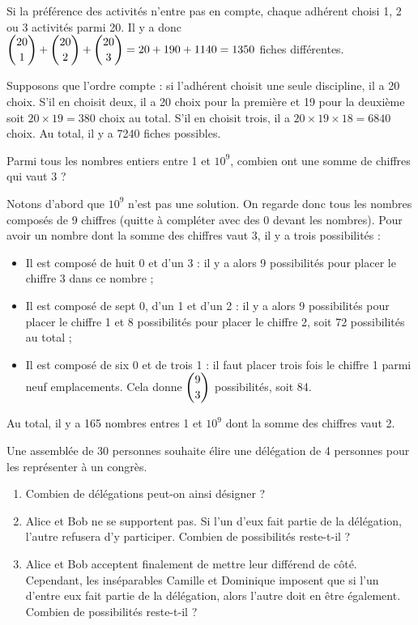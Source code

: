 \documentclass[11pt,fleqn, openany]{book} %
\begin{document}
\begin{solution}Si la préférence des activités n'entre pas en compte, chaque adhérent choisi 1, 2 ou 3 activités parmi 20. Il y a donc $\dbinom{20}{1}+\dbinom{20}{2}+\dbinom{20}{3}=20+190+1140=1350$ fiches différentes.

Supposons que l'ordre compte : si l'adhérent choisit une seule discipline, il a 20 choix. S'il en choisit deux, il a 20 choix pour la première et 19 pour la deuxième soit $20 \times 19 = 380$ choix au total. S'il en choisit trois, il a $20 \times 19 \times 18=6840$ choix. Au total, il y a 7240 fiches possibles.\end{solution}



\begin{exercise}Parmi tous les nombres entiers entre 1 et $10^9$, combien ont une somme de chiffres qui vaut 3 ?\end{exercise}

\begin{solution}Notons d'abord que $10^9$ n'est pas une solution. On regarde donc tous les nombres composés de 9 chiffres (quitte à compléter avec des 0 devant les nombres). Pour avoir un nombre dont la somme des chiffres vaut 3, il y a trois possibilités :
\begin{itemize}
\item Il est composé de huit 0 et d'un 3 : il y a alors 9 possibilités pour placer le chiffre 3 dans ce nombre ;
\item Il est composé de sept 0, d'un 1 et d'un 2 : il y a alors 9 possibilités pour placer le chiffre 1 et 8 possibilités pour placer le chiffre 2, soit 72 possibilités au total ;
\item Il est composé de six 0 et de trois 1 : il faut placer trois fois le chiffre 1 parmi neuf emplacements. Cela donne $\dbinom{9}{3}$ possibilités, soit 84.
\end{itemize}

Au total, il y a 165 nombres entres 1 et $10^9$ dont la somme des chiffres vaut 2.\end{solution}




\begin{exercise}
Une assemblée de 30 personnes souhaite élire une délégation de 4 personnes pour les représenter à un congrès.
\begin{enumerate}
\item Combien de délégations peut-on ainsi désigner ?
\item Alice et Bob ne se supportent pas. Si l'un d'eux fait partie de la délégation, l'autre refusera d'y participer. Combien de possibilités reste-t-il ?
\item Alice et Bob acceptent finalement de mettre leur différend de côté. Cependant, les inséparables Camille et Dominique imposent que si l'un d'entre eux fait partie de la délégation, alors l'autre doit en être également. Combien de possibilités reste-t-il ?
\end{enumerate}
 \end{exercise}
\end{document}
